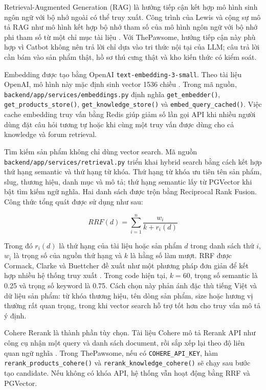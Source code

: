 \documentclass[../DoAn.tex]{subfiles}
\begin{document}
Retrieval-Augmented Generation (RAG) là hướng tiếp cận kết hợp mô hình sinh ngôn ngữ với bộ nhớ ngoài có thể truy xuất. Công trình của Lewis và cộng sự mô tả RAG như mô hình kết hợp bộ nhớ tham số của mô hình ngôn ngữ với bộ nhớ phi tham số từ một chỉ mục tài liệu \cite{lewis2020rag}. Với ThePawsome, hướng tiếp cận này phù hợp vì Catbot không nên trả lời chỉ dựa vào tri thức nội tại của LLM; câu trả lời cần bám vào sản phẩm thật, hồ sơ thú cưng thật và kho kiến thức có kiểm soát.

Embedding được tạo bằng OpenAI \texttt{text-embedding-3-small}. Theo tài liệu OpenAI, mô hình này mặc định sinh vector 1536 chiều \cite{openaiEmbeddingsDocs}. Trong mã nguồn, \texttt{backend/app/services/embeddings.py} định nghĩa \texttt{get\_embedder()}, \texttt{get\_products\_store()}, \texttt{get\_knowledge\_store()} và \texttt{embed\_query\_cached()}. Việc cache embedding truy vấn bằng Redis giúp giảm số lần gọi API khi nhiều người dùng đặt câu hỏi tương tự hoặc khi cùng một truy vấn được dùng cho cả knowledge và forum retrieval.

Tìm kiếm sản phẩm không chỉ dùng vector search. Mã nguồn \texttt{backend/app/services/retrieval.py} triển khai hybrid search bằng cách kết hợp thứ hạng semantic và thứ hạng từ khóa. Thứ hạng từ khóa ưu tiên tên sản phẩm, slug, thương hiệu, danh mục và mô tả; thứ hạng semantic lấy từ PGVector khi bật tìm kiếm ngữ nghĩa. Hai danh sách được trộn bằng Reciprocal Rank Fusion. Công thức tổng quát được sử dụng như sau:

\begin{equation}
    RRF(d) = \sum_{i=1}^{n} \frac{w_i}{k + r_i(d)}
\end{equation}

Trong đó \(r_i(d)\) là thứ hạng của tài liệu hoặc sản phẩm \(d\) trong danh sách thứ \(i\), \(w_i\) là trọng số của nguồn thứ hạng và \(k\) là hằng số làm mượt. RRF được Cormack, Clarke và Buettcher đề xuất như một phương pháp đơn giản để kết hợp nhiều hệ thống truy xuất \cite{cormack2009rrf}. Trong code hiện tại, \(k=60\), trọng số semantic là 0.25 và trọng số keyword là 0.75. Cách chọn này phản ánh đặc thù tiếng Việt và dữ liệu sản phẩm: từ khóa thương hiệu, tên dòng sản phẩm, size hoặc hương vị thường rất quan trọng, trong khi vector search hỗ trợ tốt hơn cho truy vấn mô tả ý định.

Cohere Rerank là thành phần tùy chọn. Tài liệu Cohere mô tả Rerank API như công cụ nhận một query và danh sách document, rồi sắp xếp lại theo độ liên quan ngữ nghĩa \cite{cohereRerankDocs}. Trong ThePawsome, nếu có \texttt{COHERE\_API\_KEY}, hàm \texttt{rerank\_products\_cohere()} và \texttt{rerank\_knowledge\_cohere()} sẽ chạy sau bước tạo candidate. Nếu không có khóa API, hệ thống vẫn hoạt động bằng RRF và PGVector.
\end{document}
